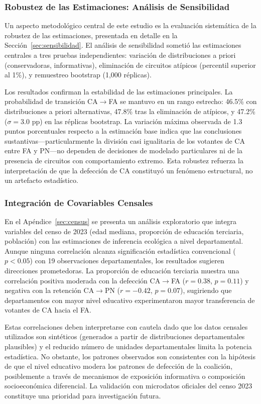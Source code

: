 \subsubsection{Robustez de las Estimaciones: Análisis de Sensibilidad}

Un aspecto metodológico central de este estudio es la evaluación sistemática de la robustez de las estimaciones, presentada en detalle en la Sección~\ref{sec:sensibilidad}. El análisis de sensibilidad sometió las estimaciones centrales a tres pruebas independientes: variación de distribuciones a priori (conservadoras, informativas), eliminación de circuitos atípicos (percentil superior al 1\%), y remuestreo bootstrap (1,000 réplicas).

Los resultados confirman la estabilidad de las estimaciones principales. La probabilidad de transición CA$\to$FA se mantuvo en un rango estrecho: 46.5\% con distribuciones a priori alternativas, 47.8\% tras la eliminación de atípicos, y 47.2\% ($\sigma = 3.0$ pp) en las réplicas bootstrap. La variación máxima observada de 1.3 puntos porcentuales respecto a la estimación base indica que las conclusiones sustantivas---particularmente la división casi igualitaria de los votantes de CA entre FA y PN---no dependen de decisiones de modelado particulares ni de la presencia de circuitos con comportamiento extremo. Esta robustez refuerza la interpretación de que la defección de CA constituyó un fenómeno estructural, no un artefacto estadístico.

\subsubsection{Integración de Covariables Censales}

En el Apéndice~\ref{sec:census} se presenta un análisis exploratorio que integra variables del censo de 2023 (edad mediana, proporción de educación terciaria, población) con las estimaciones de inferencia ecológica a nivel departamental. Aunque ninguna correlación alcanza significación estadística convencional ($p < 0.05$) con 19 observaciones departamentales, los resultados sugieren direcciones prometedoras. La proporción de educación terciaria muestra una correlación positiva moderada con la defección CA$\to$FA ($r = 0.38$, $p = 0.11$) y negativa con la retención CA$\to$PN ($r = -0.42$, $p = 0.07$), sugiriendo que departamentos con mayor nivel educativo experimentaron mayor transferencia de votantes de CA hacia el FA.

Estas correlaciones deben interpretarse con cautela dado que los datos censales utilizados son sintéticos (generados a partir de distribuciones departamentales plausibles) y el reducido número de unidades departamentales limita la potencia estadística. No obstante, los patrones observados son consistentes con la hipótesis de que el nivel educativo modera los patrones de defección de la coalición, posiblemente a través de mecanismos de exposición informativa o composición socioeconómica diferencial. La validación con microdatos oficiales del censo 2023 constituye una prioridad para investigación futura.

